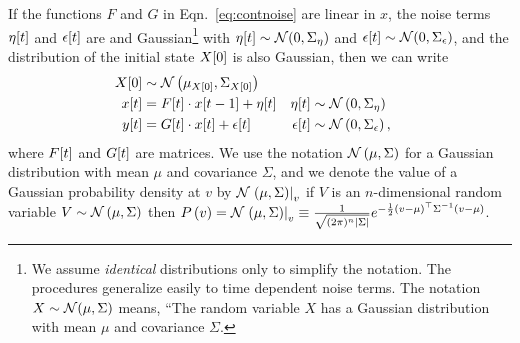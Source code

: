If the functions $F$ and $G$ in Eqn.~\eqref{eq:contnoise} are linear
in $x$, the noise terms ${\eta}{[t]}$ and ${\epsilon}{[t]}$ are \iid
and Gaussian\footnote{We assume \emph{identical} distributions only to
  simplify the notation.  The procedures generalize easily to time
  dependent noise terms.  The notation $X\sim{\mathcal{N}}(\mu,\Sigma)$
  means, ``The random variable $X$ has a Gaussian distribution with
  mean $\mu$ and covariance $\Sigma$.} with ${\eta}{[t]} \sim
{\mathcal{N}}(0,\Sigma_\eta)$ and ${\epsilon}{[t]} \sim
{\mathcal{N}}(0,\Sigma_\epsilon)$, and the distribution of the initial state
${X}{[0]}$ is also Gaussian, then we can write
\begin{subequations}
  \label{eq:LinearG}
  \begin{align}
  {X}{[0]} & \sim {\mathcal{N}}\left(\mu_{{X}{[0]}},\Sigma_{{X}{[0]}}
  \right)\\
  {x}{[t]} &= {F}{[t]} \cdot {x}{[t-1]} + {\eta}{[t]} &
  {\eta}{[t]} &\sim {\mathcal{N}}\left( 0, \Sigma_\eta \right) \\
  {y}{[t]} &= {G}{[t]} \cdot {x}{[t]} + {\epsilon}{[t]} &
  {\epsilon}{[t]} &\sim {\mathcal{N}}\left( 0, \Sigma_\epsilon \right),
  \end{align}
\end{subequations}
where ${F}{[t]}$ and ${G}{[t]}$ are matrices.  We use the notation
${\mathcal{N}}\left( \mu, \Sigma \right)$ for a Gaussian distribution with
mean $\mu$ and covariance $\Sigma$, and we denote the value of a
Gaussian probability density at $v$ by ${\mathcal{N}}\left.\left(\mu,\Sigma\right)\right|_{v}$ \ie
if $V$ is an $n$-dimensional random variable $V \sim {\mathcal{N}}\left( \mu,
  \Sigma \right)$ then $ P\left(v \right) = {\mathcal{N}}\left.\left(\mu,\Sigma\right)\right|_{v}
\equiv \frac{1}{\sqrt{(2\pi)^n \left|\Sigma\right|}} e^{-\frac{1}{2}
  (v-\mu)^\top \Sigma^{-1} (v-\mu)}$.


